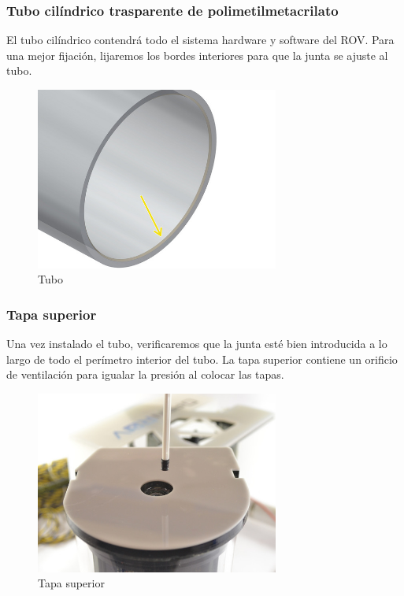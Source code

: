 \newpage
\subsubsection{Tubo cilíndrico trasparente de polimetilmetacrilato}
\label{subsubsec:tubo}
El tubo cilíndrico contendrá todo el sistema hardware y software del ROV.
Para una mejor fijación, lijaremos los bordes interiores para que la junta se ajuste al tubo.
\begin{figure} [hbtp]
\begin{center}
  \includegraphics[width=8cm]{img/cap3/3_4/tubo}
\end{center}
\caption{Tubo}
\label{fig:tubo}
\end{figure}

\subsubsection{Tapa superior}
\label{subsubsec:tapa}
Una vez instalado el tubo, verificaremos que la junta esté bien introducida a lo largo de todo el perímetro interior del tubo.
La tapa superior contiene un orificio de ventilación para igualar la presión al colocar las tapas.
\begin{figure} [hbtp]
\begin{center}
  \includegraphics[width=8cm]{img/cap3/3_4/tapa_superior}
\end{center}
\caption{Tapa superior}
\label{fig:tapa_sup}
\end{figure}  

